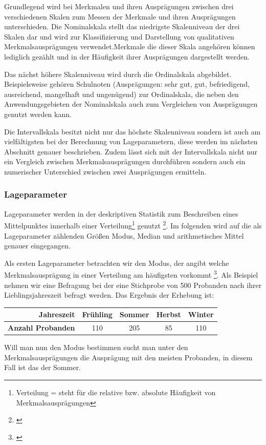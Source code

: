 Grundlegend wird bei Merkmalen und ihren Ausprägungen zwischen drei verschiedenen Skalen zum Messen der Merkmale und ihren Ausprägungen unterschieden. Die Nominalskala stellt das niedrigste Skalenniveau der drei Skalen dar und wird zur Klassifizierung und Darstellung von qualitativen Merkmalsausprägungen verwendet.Merkmale die dieser Skala angehören können lediglich gezählt und in der Häufigkeit ihrer Ausprägungen dargestellt werden.

Das nächst höhere Skalenniveau wird durch die Ordinalskala abgebildet. Beispielsweise gehören Schulnoten (Ausprägungen: sehr gut, gut, befriedigend, ausreichend, mangelhaft und ungenügend) zur Ordinalskala, die neben den Anwendungsgebieten der Nominalskala auch zum Vergleichen von Ausprägungen genutzt werden kann.

Die Intervallskala besitzt nicht nur das höchste Skalenniveau sondern ist auch am vielfältigsten bei der Berechnung von Lageparametern, diese werden im nächsten Abschnitt genauer beschrieben. Zudem lässt sich mit der Intervallskala nicht nur ein Vergleich zwischen Merkmalsausprägungen durchführen sondern auch ein numerischer Unterschied zwischen zwei Ausprägungen ermitteln.


\subsubsection{Lageparameter}
Lageparameter werden in der deskriptiven Statistik zum Beschreiben eines Mittelpunktes innerhalb einer Verteilung\footnote{Verteilung = steht für die relative bzw. absolute Häufigkeit von Merkmalsausprägungen} genutzt \footnote{\cite[vgl.][49]{Fahrmeir2016}}. Im folgenden wird auf die als Lageparameter zählenden Größen Modus, Median und arithmetisches Mittel genauer eingegangen.

Als ersten Lageparameter betrachten wir den Modus, der angibt welche Merkmalsausprägung in einer Verteilung am häufigsten vorkommt \footnote{\cite[vgl.][53]{Fahrmeir2016}}. Als Beispiel nehmen wir eine Befragung bei der eine Stichprobe von 500 Probanden nach ihrer Lieblingsjahreszeit befragt werden. Das Ergebnis der Erhebung ist:
\begin{center}
\begin{tabular}{r|c|c|c|c} 
\textbf{Jahreszeit} & Frühling & Sommer & Herbst & Winter \\ \hline
\textbf{Anzahl Probanden} & 110 & 205 & 85 & 110\\
\end{tabular}
\end{center}
Will man nun den Modus bestimmen sucht man unter den Merkmalsausprägungen die Ausprägung mit den meisten Probanden, in diesem Fall ist das der Sommer.

